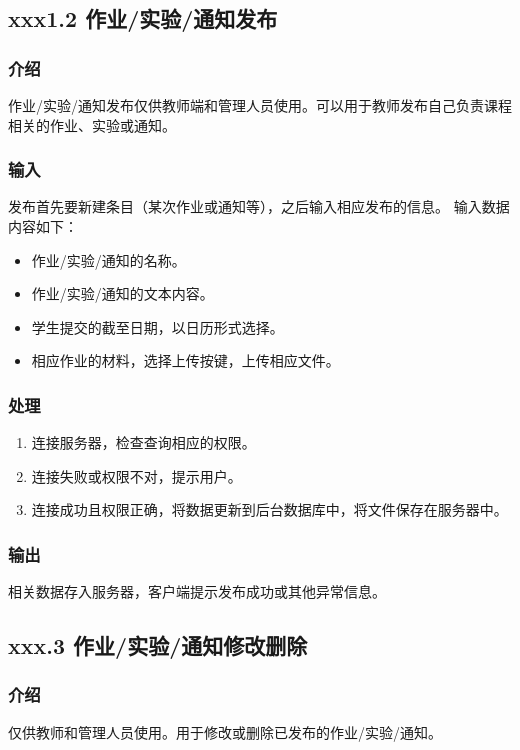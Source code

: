     \subsection{xxx1.2 作业/实验/通知发布}
      \subsubsection{介绍}
      作业/实验/通知发布仅供教师端和管理人员使用。可以用于教师发布自己负责课程相关的作业、实验或通知。
      \subsubsection{输入}
      发布首先要新建条目（某次作业或通知等），之后输入相应发布的信息。
      输入数据内容如下：
      \begin{itemize}
        \item 作业/实验/通知的名称。
        \item 作业/实验/通知的文本内容。
        \item 学生提交的截至日期，以日历形式选择。
        \item 相应作业的材料，选择上传按键，上传相应文件。
      \end{itemize}
      \subsubsection{处理}
      \begin{enumerate}
        \item 连接服务器，检查查询相应的权限。
        \item 连接失败或权限不对，提示用户。
        \item 连接成功且权限正确，将数据更新到后台数据库中，将文件保存在服务器中。
      \end{enumerate}
      \subsubsection{输出}
      相关数据存入服务器，客户端提示发布成功或其他异常信息。

    \subsection{xxx.3 作业/实验/通知修改删除}
      \subsubsection{介绍}
      仅供教师和管理人员使用。用于修改或删除已发布的作业/实验/通知。
